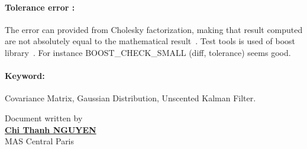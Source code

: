 \documentclass[a4paper,10pt]{article}
\begin{document}
\paragraph{Tolerance error : }
The error can provided from Cholesky factorization, making that result computed are not absolutely equal to the mathematical result~\cite{ErrorTest1}. Test tools is used of boost library~\cite{BoostCheck}. For instance BOOST\_CHECK\_SMALL (diff, tolerance) seems good. 
\paragraph{Keyword: } Covariance Matrix, Gaussian Distribution, Unscented Kalman Filter. 

						      \begin{flushright}
						      Document written by \\
						      \href{mailto:chi-thanh.nguyen@inria.fr}{{\textbf {Chi Thanh NGUYEN}}} \\
						      MAS Central Paris  
						      \end{flushright}


\end{document}
